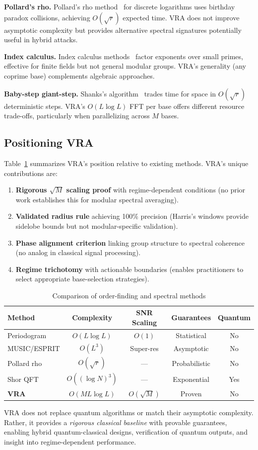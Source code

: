 \textbf{Pollard's rho.} Pollard's rho method~\cite{pollard1978rho} for discrete logarithms uses birthday paradox collisions, achieving $O(\sqrt{r})$ expected time. VRA does not improve asymptotic complexity but provides alternative spectral signatures potentially useful in hybrid attacks.

\textbf{Index calculus.} Index calculus methods~\cite{gordon1993discrete} factor exponents over small primes, effective for finite fields but not general modular groups. VRA's generality (any coprime base) complements algebraic approaches.

\textbf{Baby-step giant-step.} Shanks's algorithm~\cite{shanks1971class} trades time for space in $O(\sqrt{r})$ deterministic steps. VRA's $O(L \log L)$ FFT per base offers different resource trade-offs, particularly when parallelizing across $M$ bases.

\subsection{Positioning VRA}

Table~\ref{tab:comparison} summarizes VRA's position relative to existing methods. VRA's unique contributions are:

\begin{enumerate}
    \item \textbf{Rigorous $\sqrt{M}$ scaling proof} with regime-dependent conditions (no prior work establishes this for modular spectral averaging).
    \item \textbf{Validated radius rule} achieving 100\% precision (Harris's windows provide sidelobe bounds but not modular-specific validation).
    \item \textbf{Phase alignment criterion} linking group structure to spectral coherence (no analog in classical signal processing).
    \item \textbf{Regime trichotomy} with actionable boundaries (enables practitioners to select appropriate base-selection strategies).
\end{enumerate}

\begin{table}[t]
\centering
\caption{Comparison of order-finding and spectral methods}
\label{tab:comparison}
\begin{tabular}{@{}lcccc@{}}
\toprule
Method & Complexity & SNR Scaling & Guarantees & Quantum \\
\midrule
Periodogram & $O(L \log L)$ & $O(1)$ & Statistical & No \\
MUSIC/ESPRIT & $O(L^3)$ & Super-res & Asymptotic & No \\
Pollard rho & $O(\sqrt{r})$ & --- & Probabilistic & No \\
Shor QFT & $O((\log N)^3)$ & --- & Exponential & Yes \\
\textbf{VRA} & $O(ML \log L)$ & $O(\sqrt{M})$ & Proven & No \\
\bottomrule
\end{tabular}
\end{table}

VRA does not replace quantum algorithms or match their asymptotic complexity. Rather, it provides a \emph{rigorous classical baseline} with provable guarantees, enabling hybrid quantum-classical designs, verification of quantum outputs, and insight into regime-dependent performance.
